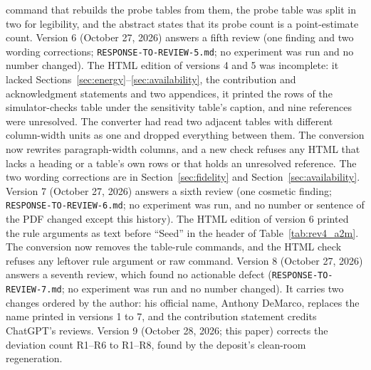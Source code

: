 command that rebuilds the probe tables from them, the probe table was split in two for legibility, and the abstract
states that its probe count is a point-estimate count. Version 6 (October 27, 2026) answers a fifth review
(one finding and two wording corrections; \texttt{RESPONSE-TO-REVIEW-5.md}; no experiment was run and no number
changed). The HTML edition of versions 4 and 5 was incomplete: it lacked Sections~\ref{sec:energy}--\ref{sec:availability}, the
contribution and acknowledgment statements and two appendices, it printed the rows of the simulator-checks table under the
sensitivity table's caption, and nine references were unresolved. The converter had read two adjacent tables with
different column-width units as one and dropped everything between them. The conversion now rewrites paragraph-width
columns, and a new check refuses any HTML that lacks a heading or a table's own rows or that holds an unresolved reference. The
two wording corrections are in Section~\ref{sec:fidelity} and Section~\ref{sec:availability}. Version 7 (October 27, 2026)
answers a sixth review (one cosmetic finding; \texttt{RESPONSE-TO-REVIEW-6.md}; no experiment was run, and no
number or sentence of the PDF changed except this history). The HTML edition of version 6 printed the rule arguments
as text before ``Seed'' in the header of Table~\ref{tab:rev4_a2m}. The conversion now removes the table-rule
commands, and the HTML check refuses any leftover rule argument or raw command. Version 8 (October 27, 2026) answers a
seventh review, which found no actionable defect (\texttt{RESPONSE-TO-REVIEW-7.md}; no experiment was run and no number
changed). It carries two changes ordered by the author: his official name, Anthony DeMarco, replaces the name printed in versions 1 to 7,
and the contribution statement credits ChatGPT's reviews. Version 9 (October 28, 2026; this paper) corrects the deviation count R1--R6 to R1--R8, found by the deposit's clean-room regeneration.

